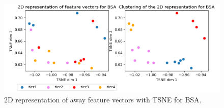 \documentclass[thesis=M,english]{FITthesis}[2019/12/23]
\begin{document}
\begin{figure}[h]
    \centering
    \includegraphics[width=1\textwidth]{figures/2d_bsa.png}
    \caption{2D representation of away feature vectors with TSNE for BSA.}
    \label{fig:bsa_2d}
\end{figure}
\end{document}
